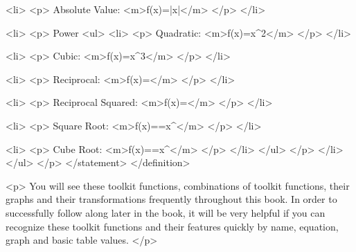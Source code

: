                         <li>
                            <p>
                                Absolute Value: <m>f(x)=|x|</m>
                            </p>
                        </li>

                        <li>
                            <p>
                                Power
                                <ul>
                                    <li>
                                        <p>
                                            Quadratic: <m>f(x)=x^{2}</m>
                                        </p>
                                    </li>

                                    <li>
                                        <p>
                                            Cubic: <m>f(x)=x^{3}</m>
                                        </p>
                                    </li>

                                    <li>
                                        <p>
                                            Reciprocal: <m>f(x)=</m>
                                        </p>
                                    </li>

                                    <li>
                                        <p>
                                            Reciprocal Squared: <m>f(x)=</m>
                                        </p>
                                    </li>

                                    <li>
                                        <p>
                                            Square Root: <m>f(x)==x^{}</m>
                                        </p>
                                    </li>

                                    <li>
                                        <p>
                                            Cube Root: <m>f(x)==x^{}</m>
                                        </p>
                                    </li>
                                </ul>
                            </p>
                        </li>
                    </ul>
                </p>
            </statement>
        </definition>

        <p>
            You will see these toolkit functions, combinations of toolkit functions, their graphs and their transformations frequently throughout this book.
            In order to successfully follow along later in the book, it will be very helpful if you can recognize these toolkit functions and their features quickly by name, equation, graph and basic table values.
        </p>

